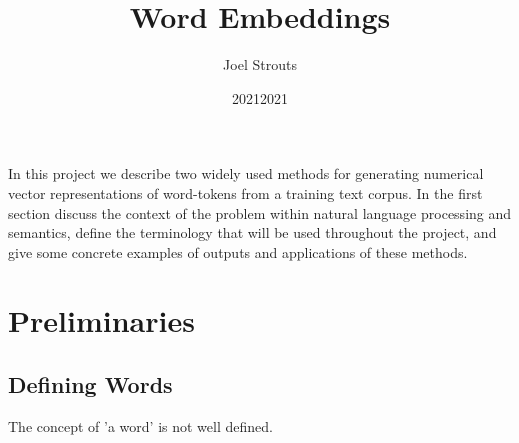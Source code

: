 \documentclass{ucetd}
\title{Word Embeddings}
\author{Joel Strouts}
\date{2021}
\date{2021}
\theoremstyle{definition}\newtheorem{definition}{Definition}
\begin{document}
\maketitle



\tableofcontents


\abstract
In this project we describe two widely used methods for generating numerical vector representations of word-tokens from a training text corpus. In the first section discuss the context of the problem within natural language processing and semantics, define the terminology that will be used throughout the project, and give some concrete examples of outputs and applications of these methods.

\mainmatter

\chapter{Preliminaries}
\section{Defining Words}
The concept of 'a word' is not well defined.
\end{document}
